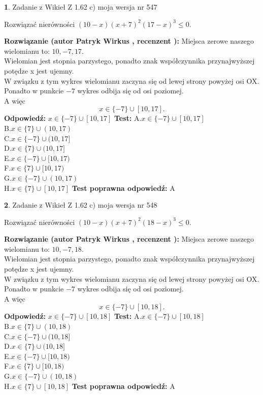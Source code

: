 \documentclass[12pt, a4paper]{article}
\theoremstyle{definition} %
\newtheorem{zad}{}
\newcommand{\zadStart}[1]{\begin{zad}#1\newline}
\newcommand{\zadStop}{\end{zad}}
\newcommand{\rozwStart}[2]{\noindent \textbf{Rozwiązanie (autor #1 , recenzent #2): }\newline}
\newcommand{\rozwStop}{\newline}
\newcommand{\odpStart}{\noindent \textbf{Odpowiedź:}\newline}
\newcommand{\odpStop}{\newline}
\newcommand{\testStart}{\noindent \textbf{Test:}\newline}
\newcommand{\testStop}{\newline}
\newcommand{\kluczStart}{\noindent \textbf{Test poprawna odpowiedź:}\newline}
\newcommand{\kluczStop}{\newline}
\begin{document}
\zadStart{Zadanie z Wikieł Z 1.62 c) moja wersja nr 547}

Rozwiązać nierówności $(10-x)(x+7)^{2}(17-x)^{3}\le0$.
\zadStop
\rozwStart{Patryk Wirkus}{}
Miejsca zerowe naszego wielomianu to: $10, -7, 17$.\\
Wielomian jest stopnia parzystego, ponadto znak współczynnika przy\linebreak najwyższej potędze x jest ujemny.\\ W związku z tym wykres wielomianu zaczyna się od lewej strony powyżej osi OX.\\
Ponadto w punkcie $-7$ wykres odbija się od osi poziomej.\\
A więc $$x \in \{-7\} \cup [10,17].$$
\rozwStop
\odpStart
$x \in \{-7\} \cup [10,17]$
\odpStop
\testStart
A.$x \in \{-7\} \cup [10,17]$\\
B.$x \in \{7\} \cup (10,17)$\\
C.$x \in \{-7\} \cup (10,17]$\\
D.$x \in \{7\} \cup (10,17]$\\
E.$x \in \{-7\} \cup [10,17)$\\
F.$x \in \{7\} \cup [10,17)$\\
G.$x \in \{-7\} \cup (10,17)$\\
H.$x \in \{7\} \cup [10,17]$
\testStop
\kluczStart
A
\kluczStop



\zadStart{Zadanie z Wikieł Z 1.62 c) moja wersja nr 548}

Rozwiązać nierówności $(10-x)(x+7)^{2}(18-x)^{3}\le0$.
\zadStop
\rozwStart{Patryk Wirkus}{}
Miejsca zerowe naszego wielomianu to: $10, -7, 18$.\\
Wielomian jest stopnia parzystego, ponadto znak współczynnika przy\linebreak najwyższej potędze x jest ujemny.\\ W związku z tym wykres wielomianu zaczyna się od lewej strony powyżej osi OX.\\
Ponadto w punkcie $-7$ wykres odbija się od osi poziomej.\\
A więc $$x \in \{-7\} \cup [10,18].$$
\rozwStop
\odpStart
$x \in \{-7\} \cup [10,18]$
\odpStop
\testStart
A.$x \in \{-7\} \cup [10,18]$\\
B.$x \in \{7\} \cup (10,18)$\\
C.$x \in \{-7\} \cup (10,18]$\\
D.$x \in \{7\} \cup (10,18]$\\
E.$x \in \{-7\} \cup [10,18)$\\
F.$x \in \{7\} \cup [10,18)$\\
G.$x \in \{-7\} \cup (10,18)$\\
H.$x \in \{7\} \cup [10,18]$
\testStop
\kluczStart
A
\kluczStop
\end{document}
